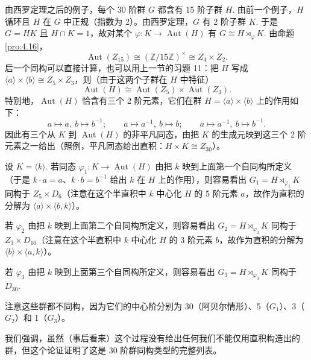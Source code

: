 \begin{example}[30 阶群]
由西罗定理之后的例子，每个 30 阶群 \(G\) 都含有 15 阶子群 \(H\). 由前一个例子，\(H\) 循环且 \(H\) 在 \(G\) 中正规（指数为 2）。由西罗定理，\(G\) 有 2 阶子群 \(K\). 于是 \(G = HK\) 且 \(H \cap K = 1\)，故对某个 \(\varphi : K \to \operatorname{Aut}(H)\) 有 \(G \cong H \rtimes_\varphi K\). 由命题 \ref{pro:4.16}，
\[
\operatorname{Aut}(Z_{15}) \cong (\mathbb{Z}/15\mathbb{Z})^\times \cong Z_4 \times Z_2.
\]
后一个同构可以直接计算，也可以用上一节的习题 11：把 \(H\) 写成 \(\langle a \rangle \times \langle b \rangle \cong Z_5 \times Z_3\)，则（由于这两个子群在 \(H\) 中特征）
\[
\operatorname{Aut}(H) \cong \operatorname{Aut}(Z_5) \times \operatorname{Aut}(Z_3).
\]
特别地，\(\operatorname{Aut}(H)\) 恰含有三个 2 阶元素，它们在群 \(H = \langle a \rangle \times \langle b \rangle\) 上的作用如下：
\[
a \mapsto a,\ b \mapsto b^{-1}; \qquad a \mapsto a^{-1},\ b \mapsto b; \qquad a \mapsto a^{-1},\ b \mapsto b^{-1}.
\]
因此有三个从 \(K\) 到 \(\operatorname{Aut}(H)\) 的非平凡同态，由把 \(K\) 的生成元映到这三个 2 阶元素之一给出（照例，平凡同态给出直积：\(H \times K \cong Z_{30}\)）。

设 \(K = \langle k \rangle\). 若同态 \(\varphi_1 : K \to \operatorname{Aut}(H)\) 由把 \(k\) 映到上面第一个自同构所定义（于是 \(k \cdot a = a\)、\(k \cdot b = b^{-1}\) 给出 \(k\) 在 \(H\) 上的作用），则容易看出 \(G_1 = H \rtimes_{\varphi_1} K\) 同构于 \(Z_5 \times D_6\)（注意在这个半直积中 \(k\) 中心化 \(H\) 的 5 阶元素 \(a\)，故作为直积的分解为 \(\langle a \rangle \times \langle b, k \rangle\)）。

若 \(\varphi_2\) 由把 \(k\) 映到上面第二个自同构所定义，则容易看出 \(G_2 = H \rtimes_{\varphi_2} K\) 同构于 \(Z_3 \times D_{10}\)（注意在这个半直积中 \(k\) 中心化 \(H\) 的 3 阶元素 \(b\)，故作为直积的分解为 \(\langle b \rangle \times \langle a, k \rangle\)）。

若 \(\varphi_3\) 由把 \(k\) 映到上面第三个自同构所定义，则容易看出 \(G_3 = H \rtimes_{\varphi_3} K\) 同构于 \(D_{30}\).

注意这些群都不同构，因为它们的中心阶分别为 30（阿贝尔情形）、5（\(G_1\)）、3（\(G_2\)）和 1（\(G_3\)）。

我们强调，虽然（事后看来）这个过程没有给出任何我们不能仅用直积构造出的群，但这个论证证明了这是 30 阶群同构类型的完整列表。
\end{example}


